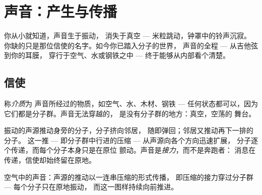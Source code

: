 \chapter{声音：产生与传播}\label{ch:g7:sound-production}

你从小就知道，声音生于振动，
消失于真空 --- 米粒跳动，钟罩中的铃声沉寂。
你缺的只是那位信使的名字。如今你已踏入分子的世界，
声音的全程 --- 从吉他弦到你的耳膜，
穿行于空气、水或钢铁之中 ---
终于能够从内部看个清楚。

\section{信使}

\begin{definition}[介质]\label{def:g7:sound-production:medium}
称\emph{介质}为
声音所经过的物质，如空气、水、木材、钢铁 ---
任何状态都可以，因为它们都是分子群。声音无法穿越的，
是没有分子群的地方：真空，空荡的
舞台。
\end{definition}

\begin{proposition}[声音如何传播]\label{prop:g7:sound-production:travel}
振动的声源推动身旁的分子，分子挤向邻居，
随即弹回；邻居又推动再下一排的分子。
这一推 --- 即分子群中行进的压缩 ---
从声源向各个方向迅速扩展，
分子逐个传递，而每个分子本身只是在原位
颤动。声音是\emph{接力}，而不是奔跑者：
消息在传递，信使却始终留在原地。
\end{proposition}

\begin{omfigure}

{\small 空气中的声音：声源的推动以一连串压缩的形式传播，
即压缩的接力穿过分子群 --- 每个分子只在原地振动，
而这一图样持续向前推进。}
\end{omfigure}

